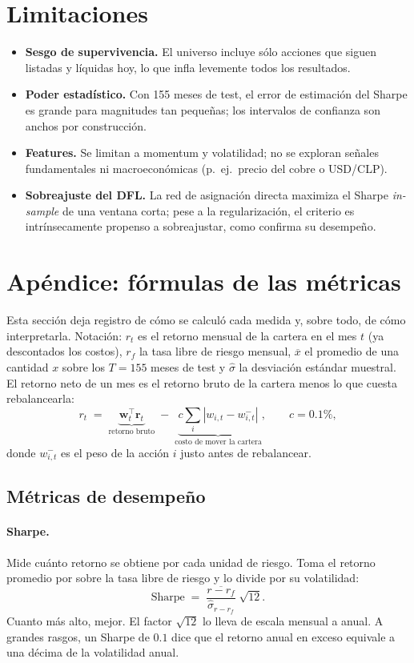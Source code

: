 \documentclass[11pt]{article}
\begin{document}
\section{Limitaciones}
\label{sec:limitaciones}
\begin{itemize}[nosep,leftmargin=*]
  \item \textbf{Sesgo de supervivencia.} El universo incluye sólo acciones que siguen listadas y
  líquidas hoy, lo que infla levemente todos los resultados.
  \item \textbf{Poder estadístico.} Con 155 meses de test, el error de estimación del Sharpe es grande
  para magnitudes tan pequeñas; los intervalos de confianza son anchos por construcción.
  \item \textbf{Features.} Se limitan a momentum y volatilidad; no se exploran señales fundamentales
  ni macroeconómicas (p.\ ej.\ precio del cobre o USD/CLP).
  \item \textbf{Sobreajuste del DFL.} La red de asignación directa maximiza el Sharpe \emph{in-sample}
  de una ventana corta; pese a la regularización, el criterio es intrínsecamente propenso a
  sobreajustar, como confirma su desempeño.
\end{itemize}


\section{Apéndice: fórmulas de las métricas}
\label{sec:formulas}
Esta sección deja registro de cómo se calculó cada medida y, sobre todo, de cómo interpretarla.
Notación: $r_t$ es el retorno mensual de la cartera en el mes $t$ (ya descontados los costos),
$r_f$ la tasa libre de riesgo mensual, $\overline{x}$ el promedio de una cantidad $x$ sobre los
$T=155$ meses de test y $\hat{\sigma}$ la desviación estándar muestral. El retorno neto de un mes es
el retorno bruto de la cartera menos lo que cuesta rebalancearla:
\[
r_t \;=\; \underbrace{\mathbf{w}_t^{\top}\mathbf{r}_t}_{\text{retorno bruto}}
\;-\; \underbrace{c\textstyle\sum_i |w_{i,t}-w_{i,t}^{-}|}_{\text{costo de mover la cartera}},
\qquad c = 0.1\%,
\]
donde $w_{i,t}^{-}$ es el peso de la acción $i$ justo antes de rebalancear.
 
\subsection*{Métricas de desempeño}
 
\paragraph{Sharpe.} Mide cuánto retorno se obtiene por cada unidad de riesgo. Toma el retorno
promedio por sobre la tasa libre de riesgo y lo divide por su volatilidad:
\[
\text{Sharpe} \;=\; \frac{\overline{r-r_f}}{\hat{\sigma}_{r-r_f}}\;\sqrt{12}.
\]
Cuanto más alto, mejor. El factor $\sqrt{12}$ lo lleva de escala mensual a anual. A grandes rasgos, un
Sharpe de $0.1$ dice que el retorno anual en exceso equivale a una décima de la volatilidad anual.
 
\end{document}
